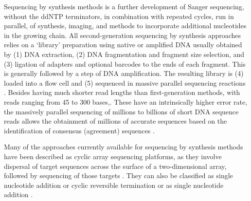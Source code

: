 Sequencing by synthesis methods is a further development of Sanger sequencing, without the \ac{ddNTP} terminators, in combination with repeated cycles, run in parallel, of synthesis, imaging, and methods to incorporate additional nucleotides in the growing chain. 
All second-generation sequencing by synthesis approaches relies on a ‘library’ preparation using native or amplified DNA usually obtained by (1) DNA extraction, (2) DNA fragmentation and fragment size selection, and (3) ligation of adapters and optional barcodes to the ends of each fragment. 
This is generally followed by a step of DNA amplification. The resulting library is (4) loaded into a flow cell and (5) sequenced in massive parallel sequencing reactions \citep{giani_long_2020}.
Besides having much shorter read lengths than first-generation methods, with reads ranging from 45 to 300 bases,. These have an intrinsically higher error rate, the massively parallel sequencing of millions to billions of short DNA sequence reads allows the obtainment of millions of accurate sequences based on the identification of consensus (agreement) sequences \citep{slatko_overview_2018, goodwin_coming_2016, hagemann_overview_2015}. 

Many of the approaches currently available for sequencing by synthesis methods have been described as cyclic array sequencing platforms, as they involve dispersal of target sequences across the surface of a two-dimensional array, followed by sequencing of those targets \citep{hagemann_overview_2015}. 
They can also be classified as single nucleotide addition or cyclic reversible termination or as single nucleotide addition \citep{goodwin_coming_2016}. 

